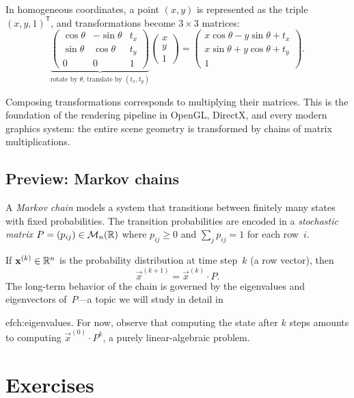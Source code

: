 In homogeneous coordinates, a point $(x,y)$ is represented as the
triple $(x,y,1)^{\mathsf{T}}$, and transformations become
$3\times 3$ matrices:
\[
  \underbrace{\begin{pmatrix}
    \cos\theta & -\sin\theta & t_x\\
    \sin\theta & \cos\theta & t_y\\
    0 & 0 & 1
  \end{pmatrix}}_{\text{rotate by $\theta$, translate by $(t_x,t_y)$}}
  \begin{pmatrix}x\\y\\1\end{pmatrix}
  = \begin{pmatrix}
    x\cos\theta - y\sin\theta + t_x\\
    x\sin\theta + y\cos\theta + t_y\\
    1
  \end{pmatrix}.
\]

Composing transformations corresponds to multiplying their matrices.
This is the foundation of the rendering pipeline in OpenGL, DirectX,
and every modern graphics system: the entire scene geometry is
transformed by chains of matrix multiplications.

\subsection{Preview: Markov chains}\label{subsec:markov-preview}

A \emph{Markov chain} models a system that transitions between finitely
many states with fixed probabilities. The transition probabilities are
encoded in a \emph{stochastic matrix}
$P = (p_{ij})\in\mathcal{M}_n({\mathbb{R}})$ where $p_{ij}\geq 0$ and
$\sum_j p_{ij} = 1$ for each row~$i$.

If $\mathbf{x}^{(k)}\in{\mathbb{R}}^n$ is the probability distribution at time
step~$k$ (a row vector), then
\[
  \vec{x}^{(k+1)} = \vec{x}^{(k)}\cdot P.
\]
The long-term behavior of the chain is governed by the eigenvalues and
eigenvectors of~$P$---a topic we will study in detail in

ef{ch:eigenvalues}. For now, observe that computing the state after
$k$ steps amounts to computing $\vec{x}^{(0)}\cdot P^k$, a purely
linear-algebraic problem.


\section{Exercises}\label{sec:exercises-ch2}

